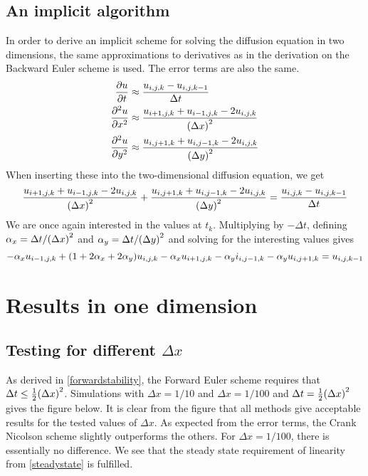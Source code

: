 \documentclass[12pt,english,a4paper]{article}
\newcommand{\program}[1]{\href{https://github.com/anjohan/Project5/blob/master/#1}{#1}}
\begin{document}
\subsection{An implicit algorithm}
In order to derive an implicit scheme for solving the diffusion equation in two dimensions, the same approximations to derivatives as in the derivation on the Backward Euler scheme is used. The error terms are also the same.
\begin{alignat*}{2}
    \pdv{u}{t} &\approx \frac{u_{i,j,k} - u_{i,j,k-1}}{\Delta t}\\
    \pdv[2]{u}{x} &\approx \frac{u_{i+1,j,k} + u_{i-1,j,k} - 2u_{i,j,k}}{\qty(\Delta x)^2}\\
    \pdv[2]{u}{y} &\approx \frac{u_{i,j+1,k} + u_{i,j-1,k} - 2u_{i,j,k}}{\qty(\Delta y)^2}
\end{alignat*}
When inserting these into the two-dimensional diffusion equation, we get
\[
    \frac{u_{i+1,j,k} + u_{i-1,j,k} - 2u_{i,j,k}}{\qty(\Delta x)^2} +
    \frac{u_{i,j+1,k} + u_{i,j-1,k} - 2u_{i,j,k}}{\qty(\Delta y)^2} =
    \frac{u_{i,j,k} - u_{i,j,k-1}}{\Delta t}
\]
We are once again interested in the values at \(t_k\). Multiplying by \(-\Delta t\), defining \(\alpha_x=\Delta t/\qty(\Delta x)^2\) and \(\alpha_y=\Delta t/\qty(\Delta y)^2\) and solving for the interesting values gives
\[
    -\alpha_x u_{i-1,j,k} + \qty(1+2\alpha_x+2\alpha_y)u_{i,j,k} - \alpha_x u_{i+1,j,k} - \alpha_y i_{i,j-1,k} - \alpha_y u_{i,j+1,k} = u_{i,j,k-1}
\]



%
\section{Results in one dimension}
\subsection{Testing for different \(\Delta x\)}
As derived in \ref{forwardstability}, the Forward Euler scheme requires that \(\Delta t \leq \tfrac{1}{2}\qty(\Delta x)^2\). Simulations with \(\Delta x = 1/10\) and \(\Delta x = 1/100\) and \(\Delta t = \tfrac{1}{2}\qty(\Delta x)^2\) gives the figure below.
%
It is clear from the figure that all methods give acceptable results for the tested values of \(\Delta x\). As expected from the error terms, the Crank Nicolson scheme slightly outperforms the others. For \(\Delta x=1/100\), there is essentially no difference. We see that the steady state requirement of linearity from \ref{steadystate} is fulfilled.




\clearpage
{}
\printbibliography
\end{document}
